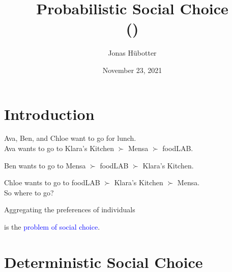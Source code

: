 \documentclass{beamer}
\title[Probabilistic Social Choice]{Probabilistic Social Choice \\ \small{(\cite{Brandl2015})}}
\author{Jonas Hübotter}
\date{November 23, 2021}
\theoremstyle{definition}
\def\b{\textcolor{blue}}
\begin{document}
\begin{frame}
    \titlepage
\end{frame}


\section{Introduction}

\begin{frame}
\begin{center}
Ava, Ben, and Chloe want to go for lunch.\pause \\[10pt]

Ava wants to go to Klara's Kitchen $\succ$ Mensa $\succ$ foodLAB.\par
Ben wants to go to Mensa $\succ$ foodLAB $\succ$ Klara's Kitchen.\par
Chloe wants to go to foodLAB $\succ$ Klara's Kitchen $\succ$ Mensa.\pause \\[10pt]

So where to go?\pause \\[25pt]

\large{Aggregating the preferences of individuals\par is the \b{problem of social choice}.}
\end{center}
\end{frame}

\section{Deterministic Social Choice}
\end{document}
